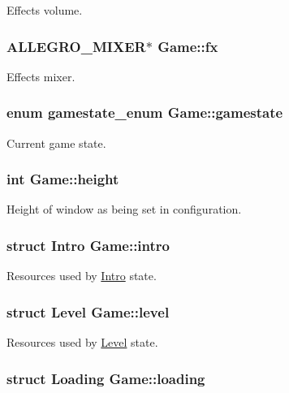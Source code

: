 Effects volume. \hypertarget{structGame_adb4702bfcc1973de315ead6d683331b2}{
\subsubsection[{fx}]{\setlength{\rightskip}{0pt plus 5cm}A\-L\-L\-E\-G\-R\-O\-\_\-\-M\-I\-X\-E\-R$\ast$ Game\-::fx}}\label{structGame_adb4702bfcc1973de315ead6d683331b2}
Effects mixer. \hypertarget{structGame_a5118a01ee6bb74fb41e8e8880a5b85a2}{
\subsubsection[{gamestate}]{\setlength{\rightskip}{0pt plus 5cm}enum {\bf gamestate\-\_\-enum} Game\-::gamestate}}\label{structGame_a5118a01ee6bb74fb41e8e8880a5b85a2}
Current game state. \hypertarget{structGame_aa6d1743c45de5558a0ca99078df85250}{
\subsubsection[{height}]{\setlength{\rightskip}{0pt plus 5cm}int Game\-::height}}\label{structGame_aa6d1743c45de5558a0ca99078df85250}
Height of window as being set in configuration. \hypertarget{structGame_afcc0b09f19df8162100973a002509000}{
\subsubsection[{intro}]{\setlength{\rightskip}{0pt plus 5cm}struct {\bf Intro} Game\-::intro}}\label{structGame_afcc0b09f19df8162100973a002509000}
Resources used by \hyperlink{structIntro}{Intro} state. \hypertarget{structGame_aa258068886c6db9c88d73e07c7e114f2}{
\subsubsection[{level}]{\setlength{\rightskip}{0pt plus 5cm}struct {\bf Level} Game\-::level}}\label{structGame_aa258068886c6db9c88d73e07c7e114f2}
Resources used by \hyperlink{structLevel}{Level} state. \hypertarget{structGame_a496f71737460d24add0f426f7fbc90b9}{
\subsubsection[{loading}]{\setlength{\rightskip}{0pt plus 5cm}struct {\bf Loading} Game\-::loading}}\label{structGame_a496f71737460d24add0f426f7fbc90b9}
